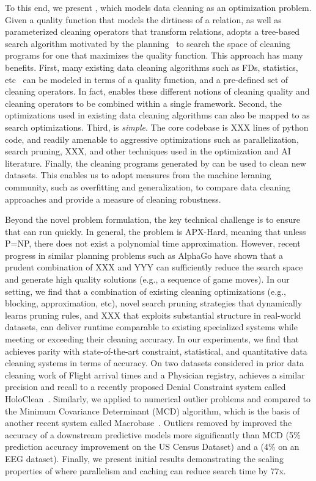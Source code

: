 To this end, we present \sys, which models data cleaning as an optimization problem.  
Given a quality function that models the dirtiness of a relation, as well as parameterized cleaning operators that transform relations, \sys adopts a tree-based search algorithm motivated by the planning~\cite{} to search the space of cleaning programs for one that maximizes the quality function.
This approach has many benefits.
First, many existing data cleaning algorithms such as FDs, statistics, etc~\cite{} can be modeled in terms of a quality function, and a pre-defined set of cleaning operators.
In fact, \sys enables these different notions of cleaning quality and cleaning operators to be combined within a single framework. 
Second, the optimizations used in existing data cleaning algorithms can also be mapped to \sys as search optimizations. 
Third, \sys is {\it simple}.  The core codebase is XXX lines of python code, and readily amenable to aggressive optimizations such as parallelization, search pruning, XXX, and other techniques used in the optimization and AI literature.
Finally, the cleaning programs generated by \sys can be used to clean new datasets.   This enables us to adopt measures from the machine leraning community, such as overfitting and generalization, to compare data cleaning approaches and provide a measure of cleaning robustness.

Beyond the novel problem formulation, the key technical challenge is to ensure that \sys can run quickly.  In general, the problem is APX-Hard, meaning that unless P=NP, there does not exist a polynomial time approximation.  However, recent progress in similar planning problems such as AlphaGo have shown that a prudent combination of XXX and YYY can sufficiently reduce the search space and generate high quality solutions (e.g., a sequence of game moves).   In our setting, we find that a combination of existing cleaning optimizations (e.g., blocking, approximation, etc), novel search pruning strategies that dynamically learns pruning rules, and XXX that exploits substantial structure in real-world datasets, can deliver runtime comparable to existing specialized systems while meeting or exceeding their cleaning accuracy.  
In our experiments, we find that \sys achieves parity with state-of-the-art constraint, statistical, and quantitative data cleaning systems in terms of accuracy.
On two datasets considered in prior data cleaning work of Flight arrival times and a Physician registry, \sys achieves a similar precision and recall to a recently proposed Denial Constraint system called HoloClean~\cite{rekatsinas2017holoclean}. 
Similarly, we applied \sys to numerical outlier problems and compared to the Minimum Covariance Determinant (MCD) algorithm, which is the basis of another recent system called Macrobase~\cite{bailis2016macrobase}.
Outliers removed by \sys  improved the accuracy of a downstream predictive models more significantly than MCD (5\% prediction accuracy improvement on the US Census Dataset) and a (4\% on an EEG dataset). 
Finally, we present initial results demonstrating the scaling properties of \sys where parallelism and caching can reduce search time by 77x.

